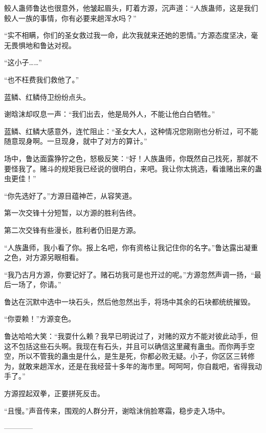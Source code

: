 \begin{this_body}
鲛人蛊师鲁达也很意外，他皱起眉头，盯着方源，沉声道：“人族蛊师，这是我们鲛人一族的事情，你有必要来趟浑水吗？”

“实不相瞒，你们的圣女救过我一命，此次我就来还她的恩情。”方源态度坚决，毫无畏惧地和鲁达对视。

“这小子……”

“也不枉费我们救他了。”

蓝鳞、红鳞侍卫纷纷点头。

谢晗沫却叹息一声：“我们出去，他是局外人，不能让他白白牺牲。”

蓝鳞、红鳞大感意外，连忙阻止：“圣女大人，这种情况您刚刚也分析过，可不能随意现身啊。一旦现身，就中了对方的算计。”

场中，鲁达面露狰狞之色，怒极反笑：“好！人族蛊师，你既然自己找死，那就不要怪我了。赌斗的规矩我已经说的很明白，来吧。我让你太挑选，看谁赌出来的蛊虫更佳！”

“你先选好了。”方源目蕴神芒，从容笑道。

第一次交锋十分短暂，以方源的胜利告终。

第二次交锋有些漫长，胜利者仍旧是方源。

“人族蛊师，我小看了你。报上名吧，你有资格让我记住你的名字。”鲁达露出凝重之色，对方源另眼相看。

“我乃古月方源，你要记好了。赌石坊我可是也开过的呢。”方源忽然声调一扬，“最后一场了，你请。”

鲁达在沉默中选中一块石头，然后他忽然出手，将场中其余的石块都统统摧毁。

“你耍赖！”方源变色。

鲁达哈哈大笑：“我耍什么赖？我早已明说过了，对赌的双方不能对彼此动手，但这不包括这些石头啊。我现在有石头，并且可以确信这里藏有蛊虫。而你两手空空，所以不管我的蛊虫是什么，是生是死，你都必败无疑。小子，你区区三转修为，就敢来趟浑水，还是在我经营十多年的海市里。呵呵呵，你自裁吧，省得我动手了。”

方源捏起双拳，正要拼死反击。

“且慢。”声音传来，围观的人群分开，谢晗沫俏脸寒霜，稳步走入场中。

------------

\end{this_body}

